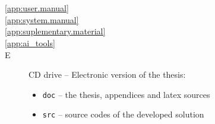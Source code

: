 
\chapter*{\appendixlistname}

\begin{description}

   \item[\autoref{app:user.manual}] 
   \item[\autoref{app:system.manual}] 
   \item[\autoref{app:suplementary.material}] 
   \item[\autoref{app:ai_tools}] 
   \item[\appendixname{} E] CD drive -- Electronic version of the thesis:
   \begin{itemize}
    \item \texttt{doc} -- the thesis, appendices and latex sources
    \item \texttt{src} -- source codes of the developed solution
   \end{itemize}


\end{description}
